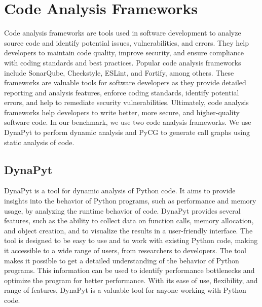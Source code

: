 \section{Code Analysis Frameworks}
Code analysis frameworks are tools used in software development to analyze source code and identify potential issues, vulnerabilities, and errors.
They help developers to maintain code quality, improve security, and ensure compliance with coding standards and best practices.
Popular code analysis frameworks include SonarQube, Checkstyle, ESLint, and Fortify, among others. \cite{static_code_analysis_tools}
These frameworks are valuable tools for software developers as they provide detailed reporting and analysis features, enforce coding standards, identify potential errors, and help to remediate security vulnerabilities.
Ultimately, code analysis frameworks help developers to write better, more secure, and higher-quality software code. \cite{Code_analysis_1, Code_analysis_2, static_code_analysis}
In our benchmark, we use two code analysis frameworks.
We use DynaPyt to perform dynamic analysis and PyCG to generate call graphs using static analysis of code.

\subsection{DynaPyt}
DynaPyt is a tool for dynamic analysis of Python code.
It aims to provide insights into the behavior of Python programs, such as performance and memory usage, by analyzing the runtime behavior of code.
DynaPyt provides several features, such as the ability to collect data on function calls, memory allocation, and object creation, and to visualize the results in a user-friendly interface.
The tool is designed to be easy to use and to work with existing Python code, making it accessible to a wide range of users, from researchers to developers.
The tool makes it possible to get a detailed understanding of the behavior of Python programs.
This information can be used to identify performance bottlenecks and optimize the program for better performance.
With its ease of use, flexibility, and range of features, DynaPyt is a valuable tool for anyone working with Python code. \cite{DynaPyt2022}

